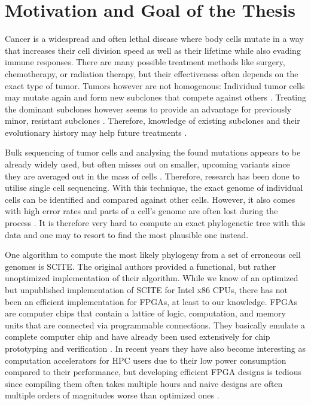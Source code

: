 \section{Motivation and Goal of the Thesis}

Cancer is a widespread and often lethal disease\cite{10.1001/jamaoncol.2021.6987} where body cells mutate in a way that increases their cell division speed as well as their lifetime while also evading immune responses. There are many possible treatment methods like surgery, chemotherapy, or radiation therapy, but their effectiveness often depends on the exact type of tumor. Tumors however are not homogenous: Individual tumor cells may mutate again and form new subclones that compete against others \cite{nik2012life}. Treating the dominant subclones however seems to provide an advantage for previously minor, resistant subclones \cite{gillies2012evolutionary}. Therefore, knowledge of existing subclones and their evolutionary history may help future treatments \cite{greaves2012clonal}\cite{stratton2009cancer}\cite{swanton2012intratumor}.

Bulk sequencing of tumor cells and analysing the found mutations appears to be already widely used, but often misses out on smaller, upcoming variants since they are averaged out in the mass of cells \cite{navin2014cancer}. Therefore, research has been done to utilise single cell sequencing. With this technique, the exact genome of individual cells can be identified and compared against other cells. However, it also comes with high error rates and parts of a cell's genome are often lost during the process \cite{tree2016}. It is therefore very hard to compute an exact phylogenetic tree with this data and one may to resort to find the most plausible one instead.

One algorithm to compute the most likely phylogeny from a set of erroneous cell genomes is \ac{SCITE}\cite{tree2016}. The original authors provided a functional, but rather unoptimized implementation of their algorithm. While we know of an optimized but unpublished implementation of \ac{SCITE} for Intel x86 CPUs, there has not been an efficient implementation for \acp{FPGA}, at least to our knowledge. \acp{FPGA} are computer chips that contain a lattice of logic, computation, and memory units that are connected via programmable connections. They basically emulate a complete computer chip and have already been used extensively for chip prototyping and verification \cite{rodriguez2007features}. In recent years they have also become interesting as computation accelerators for \ac{HPC} users due to their low power consumption compared to their performance, but developing efficient \ac{FPGA} designs is tedious since compiling them often takes multiple hours and naive designs are often multiple orders of magnitudes worse than optimized ones \cite{betkaoui2010comparing}. 

